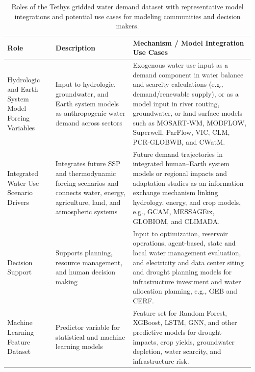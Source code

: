 \documentclass[fleqn,10pt]{wlscirep}
\begin{document}
\begin{table}[!ht]
\centering
\small
\begin{tabular}{p{3.2cm} p{4.5cm} p{8.4cm}}
\hline
\textbf{Role} & \textbf{Description} & \textbf{Mechanism / Model Integration Use Cases} \\
\hline

Hydrologic and Earth System Model Forcing Variables &
Input to hydrologic, groundwater, and Earth system models as anthropogenic water demand across sectors &
Exogenous water use input as a demand component in water balance and scarcity calculations (e.g., demand/renewable supply), or as a model input in river routing, groundwater, or land surface models such as MOSART-WM\cite{hess-17-4555-2013}, MODFLOW\cite{modflow6}, Superwell\cite{superwell}, ParFlow\cite{parflow}, VIC\cite{vic}, CLM\cite{clm5}, PCR-GLOBWB\cite{pcrglobwb}, and CWatM\cite{cwatm}. \\

Integrated Water Use Scenario Drivers &
Integrates future SSP and thermodynamic forcing scenarios and connects water, energy, agriculture, land, and atmospheric systems &
Future demand trajectories in integrated human--Earth system models or regional impacts and adaptation studies as an information exchange mechanism linking hydrology, energy, and crop models, e.g., GCAM\cite{Calvin2019GCAM}, MESSAGEix\cite{messageix}, GLOBIOM\cite{globiom}, and CLIMADA\cite{climada}. \\

Decision Support &
Supports planning, resource management, and human decision making &
Input to optimization, reservoir operations, agent-based, state and local water management evaluation, and electricity and data center siting and drought planning models for infrastructure investment and water allocation planning, e.g., GEB\cite{geb} and CERF\cite{Vernon2021,Vernon2023GRIDCERF}. \\

Machine Learning Feature Dataset &
Predictor variable for statistical and machine learning models &
Feature set for Random Forest, XGBoost, LSTM, GNN, and other predictive models for drought impacts, crop yields, groundwater depletion, water scarcity, and infrastructure risk. \\

\hline
\end{tabular}
\caption{Roles of the Tethys gridded water demand dataset with representative model integrations and potential use cases for modeling communities and decision makers.}
\label{tab:water_demand_roles}
\end{table}
\end{document}
